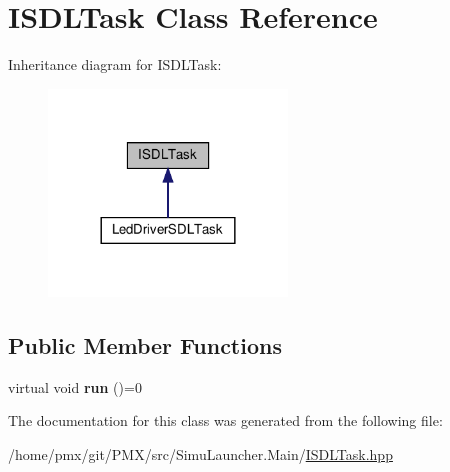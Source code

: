 \hypertarget{classISDLTask}{}\section{I\+S\+D\+L\+Task Class Reference}
\label{classISDLTask}


Inheritance diagram for I\+S\+D\+L\+Task\+:
\nopagebreak
\begin{figure}[H]
\begin{center}
\leavevmode
\includegraphics[width=180pt]{classISDLTask__inherit__graph}
\end{center}
\end{figure}
\subsection*{Public Member Functions}
\begin{DoxyCompactItemize}
\item 
\mbox{\label{classISDLTask_ac5d64bef17fef296680c7c39a0186bf7}} 
virtual void {\bfseries run} ()=0
\end{DoxyCompactItemize}


The documentation for this class was generated from the following file\+:\begin{DoxyCompactItemize}
\item 
/home/pmx/git/\+P\+M\+X/src/\+Simu\+Launcher.\+Main/\hyperlink{ISDLTask_8hpp}{I\+S\+D\+L\+Task.\+hpp}\end{DoxyCompactItemize}
